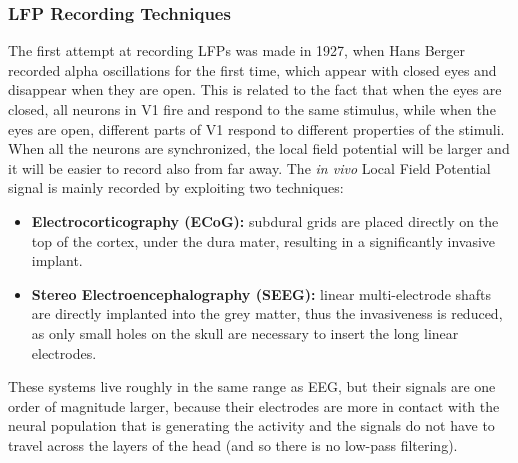 \subsubsection{LFP Recording Techniques}
The first attempt at recording LFPs was made in 1927, when Hans Berger recorded alpha
oscillations for the first time, which appear with closed eyes and disappear when
they are open. This is related to the fact that when the eyes are closed, all neurons
in V1 fire and respond to the same stimulus, while when the eyes are open, different
parts of V1 respond to different properties of the stimuli. When all the neurons are
synchronized, the local field potential will be larger and it will be easier to
record also from far away. The \textit{in vivo} Local Field Potential signal is mainly
recorded by exploiting two techniques:
\begin{itemize}
    \item \textbf{Electrocorticography (ECoG):} subdural grids are placed directly on
          the top of the cortex, under the dura mater, resulting in a significantly
          invasive implant.
    \item \textbf{Stereo Electroencephalography (SEEG):} linear multi-electrode shafts
          are directly implanted into the grey matter, thus the invasiveness is reduced,
          as only small holes on the skull are necessary to insert the long linear electrodes.
\end{itemize}
These systems live roughly in the same range as EEG, but their signals are one order of
magnitude larger, because their electrodes are more in contact with the neural population
that is generating the activity and the signals do not have to travel across the layers of
the head (and so there is no low-pass filtering).
